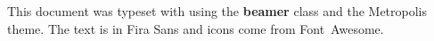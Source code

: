 \begin{frame}[plain]
  \begin{adjustwidth}{20mm}{20mm}
    \scriptsize \raggedright %
    This document was typeset with {\XeLaTeX} using the
    \textbf{beamer} class and the Metropolis theme. The text is in
    Fira Sans and icons come from Font~Awesome.
  \end{adjustwidth}
\end{frame}

